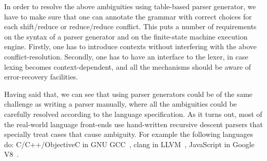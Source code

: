 \noindent
In order to resolve the above ambiguities using table-based parser generator,
we have to make sure that one can annotate the grammar with correct choices for
each shift/reduce or reduce/reduce conflict. This puts a number of requirements
on the syntax of a parser generator and on the finite-state machine execution
engine.  Firstly, one has to introduce contexts without interfering with the
above conflict-resolution.  Secondly, one has to have an interface to the lexer,
in case lexing becomes context-dependent, and all the mechanisms should be aware 
of error-recovery facilities.

Having said that, we can see that using parser generators could be of
the same challenge as writing a parser manually, where all the
ambiguities could be carefully resolved according to the language
specification.  As it turns out, most of the real-world language
front-ends use hand-written recursive descent parsers that specially
treat cases that cause ambiguity.  For example the following languages do:
C/C++/ObjectiveC in GNU GCC~\cite{gcc}, clang in LLVM~\cite{clang}, 
JavaScript in Google V8~\cite{v8}.

